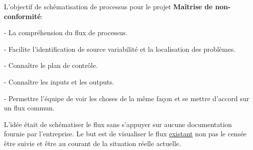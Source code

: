 \documentclass[12pt, a4paper]{thesis}
\begin{document}
L'objectif de schématisation de processus pour le projet \textbf{Maîtrise de non-conformité}:
\item - La compréhension du flux de processus.
\item - Facilite l'identification de source variabilité et la localisation des problèmes.
\item - Connaître le plan de contrôle. 
\item - Connaître les inputs et les outputs.
\item - Permettre l'équipe de voir les choses de la même façon et se mettre d'accord sur un flux commun.


L'idée était de schématiser le flux sans s'appuyer sur aucune documentation fournie par l'entreprise. Le but est de visualiser le flux \underline{existant} non pas le censée être suivie et  être au courant de la situation réelle actuelle.\\
\end{document}
